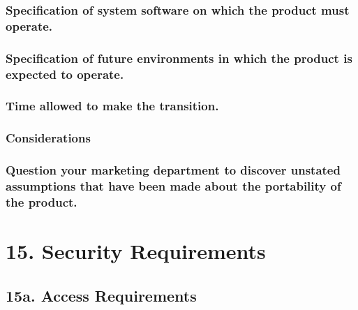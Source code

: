 \documentclass[
]{article}
\begin{document}
\hypertarget{specification-of-system-software-on-which-the-product-must-operate.}{%
\subsubsection{Specification of system software on which the product
must
operate.}\label{specification-of-system-software-on-which-the-product-must-operate.}}

\hypertarget{specification-of-future-environments-in-which-the-product-is-expected-to-operate.}{%
\subsubsection{Specification of future environments in which the product
is expected to
operate.}\label{specification-of-future-environments-in-which-the-product-is-expected-to-operate.}}

\hypertarget{time-allowed-to-make-the-transition.}{%
\subsubsection{Time allowed to make the
transition.}\label{time-allowed-to-make-the-transition.}}

\hypertarget{considerations-35}{%
\subsubsection{Considerations}\label{considerations-35}}

\hypertarget{question-your-marketing-department-to-discover-unstated-assumptions-that-have-been-made-about-the-portability-of-the-product.}{%
\subsubsection{Question your marketing department to discover unstated
assumptions that have been made about the portability of the
product.}\label{question-your-marketing-department-to-discover-unstated-assumptions-that-have-been-made-about-the-portability-of-the-product.}}

\hypertarget{security-requirements}{%
\section{15. Security Requirements}\label{security-requirements}}

\hypertarget{a.-access-requirements}{%
\subsection{15a. Access Requirements}\label{a.-access-requirements}}
\end{document}
